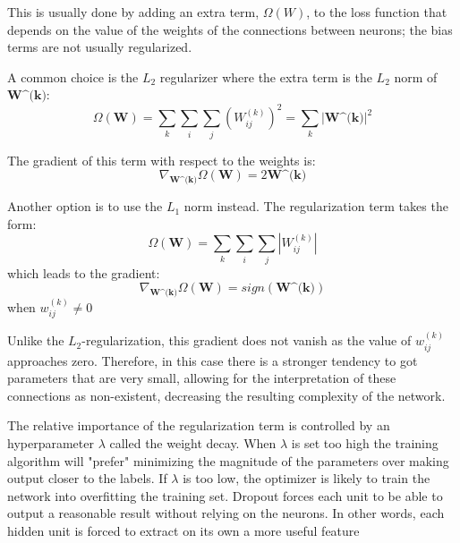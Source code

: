 This is usually done by adding an extra term, $\Omega \left( W \right) $, to the loss function that depends on the value of the weights of the connections between neurons; the bias terms are not usually regularized.

A common choice is the $L_2$ regularizer where the extra term is the $L_2$ norm of $\textbf{W^{(k)}}$:
\begin{equation}
\Omega \left( \textbf{W} \right) = \sum_k \sum_i \sum_j \left( W_{ij}^{(k)} \right)^2 = \sum_k |\textbf{W^{(k)}} | ^2
\label{eq:L2-reg}
\end{equation}

The gradient of this term with respect to the weights is:
\begin{equation}
\nabla_{\textbf{W^{(k)}}} \Omega \left( \textbf{W} \right) = 2 \textbf{W^{(k)}}
\label{eq:L2-reg-grad}
\end{equation}

Another option is to use the $L_1$ norm instead. The regularization term takes the form:
\begin{equation}
\Omega \left( \textbf{W} \right) = \sum_k \sum_i \sum_j | W_{ij}^{(k)} |
\label{eq:L1-reg}
\end{equation}
which leads to the gradient:
\begin{equation}
\nabla_{\textbf{W^{(k)}}} \Omega \left( \textbf{W} \right) = sign \left( \textbf{W^{(k)}} \right)
\label{eq:L1-reg-grad}
\end{equation}
when $w_{ij}^{(k)} \neq 0$

Unlike the $L_2$-regularization, this gradient does not vanish as the value of $w_{ij}^{(k)}$ approaches zero. Therefore, in this case there is a stronger tendency to got parameters that are very small, allowing for the interpretation of these connections as non-existent, decreasing the resulting complexity of the network.

The relative importance of the regularization term is controlled by an hyperparameter $\lambda$ called the weight decay. When $\lambda$ is set too high the training algorithm will "prefer" minimizing the magnitude of the parameters over making output closer to the labels. If $\lambda$ is too low, the optimizer is likely to train the network into overfitting the training set.
Dropout
forces each unit to be able to output a reasonable result without relying on the neurons. In other words, each hidden unit is forced to extract on its own a more useful feature
